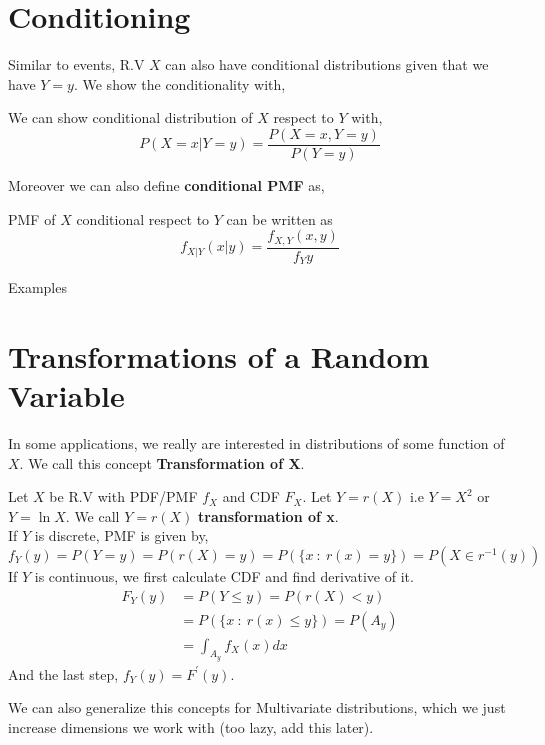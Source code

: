\section{Conditioning}
Similar to events, R.V $X$ can also have conditional distributions given that we have $Y=y$. We show the conditionality with,
\begin{definition}
    We can show conditional distribution of $X$ respect to $Y$ with,
    \[P(X=x| Y=y) = \frac{ P(X=x,Y=y)}{P(Y=y)} \]
\end{definition}
Moreover we can also define \textbf{conditional PMF} as,
\begin{definition}
    PMF of $X$ conditional respect to $Y$ can be written as 
    \[ f_{X|Y}(x|y)= \frac{f_{X,Y}(x,y)}{f_Y{y}}\]
\end{definition}

Examples \\


\section{Transformations of a Random Variable}
In some applications, we really are interested in distributions of some function of $X$. We call this concept \textbf{Transformation of X}.
\begin{definition}
    Let $X$ be R.V with PDF/PMF $f_X$ and CDF $F_X$. Let $Y=r(X)$ i.e $Y=X^2$ or $Y = \ln X$. We call $Y=r(X)$ \textbf{transformation of x}. \\
    \newline
    If $Y$ is discrete, PMF is given by,
    \[f_Y(y)= P(Y=y) =  P( r(X) = y) = P( \{x \ : \ r(x) = y\})= P( X \in r^{-1}(y)) \]
    \newline
    If $Y$ is continuous, we first calculate CDF and find derivative of it. 
    \begin{align*}
        F_Y(y) &= P( Y \le y) = P(r(X) < y) \\
               &= P(\{x \ : \ r(x) \le y \}) = P( A_y)    \\
               &= \int_{A_y} f_X(x)dx
    \end{align*}
    And the last step, $f_Y(y) = F^{'}(y)$.
\end{definition}
We can also generalize this concepts for Multivariate distributions, which we just increase dimensions we work with (too lazy, add this later).